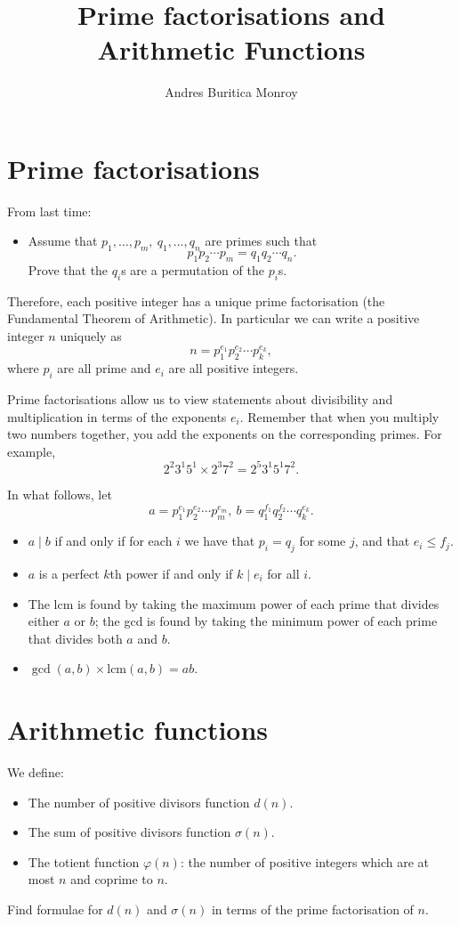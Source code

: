 \documentclass{article}
\title{Prime factorisations and Arithmetic Functions}
\author{Andres Buritica Monroy}
\date{}
\newcommand\lcm{\text{lcm}}
\begin{document}
\maketitle
\section{Prime factorisations}
  From last time:
  \begin{itemize}
    \item Assume that $p_1,\ldots,p_m,\ q_1,\ldots,q_n$ are primes such that
      \[p_1p_2\cdots p_m=q_1q_2\cdots q_n.\]
      Prove that the $q_i$s are a permutation of the $p_i$s.
  \end{itemize}
  Therefore, each positive integer has a unique prime factorisation (the
  Fundamental Theorem of Arithmetic).
  In particular we can write a positive integer $n$ uniquely as
  \[n=p_1^{e_1}p_2^{e_2}\cdots p_k^{e_k},\]
  where $p_i$ are all prime and $e_i$ are all positive integers.

  Prime factorisations allow us to view statements about divisibility and
  multiplication in terms of the exponents $e_i$. Remember that when you
  multiply two numbers together, you add the exponents on the corresponding
  primes. For example,
  \[2^2 3^1 5^1\times 2^3 7^2=2^5 3^1 5^1 7^2.\]

  In what follows, let 
  \[a=p_1^{e_1}p_2^{e_2}\cdots p_m^{e_m},\
        b=q_1^{f_1}q_2^{f_2}\cdots q_k^{e_k}.\]
  \begin{itemize}
    \item $a\mid b$ if and only if for each $i$ we have that $p_i=q_j$
      for some $j$, and that $e_i\le f_j$.
    \item $a$ is a perfect $k$th power if and only if $k\mid e_i$ for all $i$.
    \item The lcm is found by taking the maximum power of each prime that
      divides either $a$ or $b$; the gcd is found by taking the minimum power of
      each prime that divides both $a$ and $b$.
    \item $\gcd(a,b)\times\lcm(a,b)=ab$.
  \end{itemize}
\section{Arithmetic functions}
  We define:
  \begin{itemize}
    \item The number of positive divisors function $d(n)$.
    \item The sum of positive divisors function $\sigma(n)$.
    \item The totient function $\varphi(n)$: the number of positive integers
      which are at most $n$ and coprime to $n$.
  \end{itemize}
  Find formulae for $d(n)$ and $\sigma(n)$ in terms of the prime factorisation
  of $n$.
\end{document}
